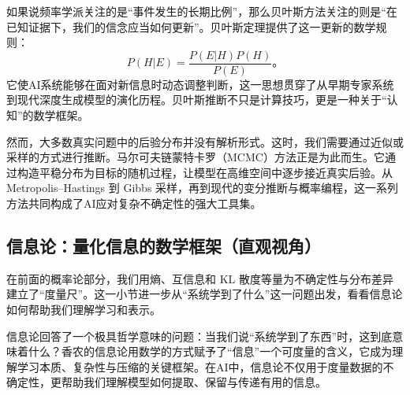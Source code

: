 如果说频率学派关注的是“事件发生的长期比例”，那么贝叶斯方法关注的则是“在已知证据下，我们的信念应当如何更新”。贝叶斯定理提供了这一更新的数学规则：
$$
P(H|E) = \frac{P(E|H)P(H)}{P(E)}。
$$
它使AI系统能够在面对新信息时动态调整判断，这一思想贯穿了从早期专家系统到现代深度生成模型的演化历程。贝叶斯推断不只是计算技巧，更是一种关于“认知”的数学框架。
 
 然而，大多数真实问题中的后验分布并没有解析形式。这时，我们需要通过近似或采样的方式进行推断。马尔可夫链蒙特卡罗（MCMC）方法正是为此而生。它通过构造平稳分布为目标的随机过程，让模型在高维空间中逐步接近真实后验。从 Metropolis–Hastings 到 Gibbs 采样，再到现代的变分推断与概率编程，这一系列方法共同构成了AI应对复杂不确定性的强大工具集。
 
 \subsection{信息论：量化信息的数学框架（直观视角）}



在前面的概率论部分，我们用熵、互信息和 KL 散度等量为不确定性与分布差异建立了“度量尺”。这一小节进一步从“系统学到了什么”这一问题出发，看看信息论如何帮助我们理解学习和表示。


信息论回答了一个极具哲学意味的问题：当我们说“系统学到了东西”时，这到底意味着什么？香农的信息论用数学的方式赋予了“信息”一个可度量的含义，它成为理解学习本质、复杂性与压缩的关键框架。在AI中，信息论不仅用于度量数据的不确定性，更帮助我们理解模型如何提取、保留与传递有用的信息。


